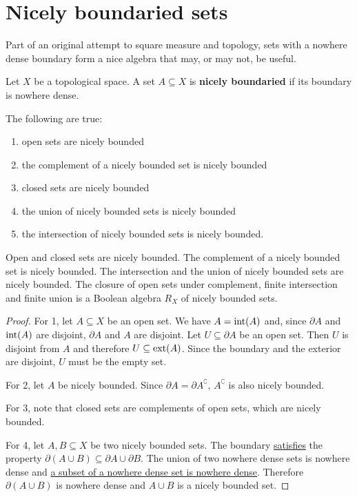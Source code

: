 \section{Nicely boundaried sets}
Part of an original attempt to square measure and topology, sets with a nowhere dense boundary form a nice algebra that may, or may not, be useful.

\begin{mathSection}
	\begin{defn}
		Let $X$ be a topological space. A set $A \subseteq X$ is \textbf{nicely boundaried} if its boundary is nowhere dense.
	\end{defn}
	
	\begin{prop}
		The following are true:
		\begin{enumerate}
			\item open sets are nicely bounded
			\item the complement of a nicely bounded set is nicely bounded
			\item closed sets are nicely bounded
			\item the union of nicely bounded sets is nicely bounded
			\item the intersection of nicely bounded sets is nicely bounded.
		\end{enumerate}
		
		Open and closed sets are nicely bounded. The complement of a nicely bounded set is nicely bounded. The intersection and the union of nicely bounded sets are nicely bounded. The closure of open sets under complement, finite intersection and finite union is a Boolean algebra $R_X$ of nicely bounded sets.
	\end{prop}
	
	\begin{proof}
		For 1, let $A \subseteq X$ be an open set. We have $A = \operatorname{int}(A)$ and, since $\partial A$ and $\operatorname{int}(A)$ are disjoint, $\partial A$ and $A$ are disjoint. Let $U \subseteq \partial A$ be an open set. Then $U$ is disjoint from $A$ and therefore $U \subseteq \operatorname{ext}(A)$. Since the boundary and the exterior are disjoint, $U$ must be the empty set.
		
		For 2, let $A$ be nicely bounded. Since $\partial A = \partial A^{\complement}$, $A^{\complement}$ is also nicely bounded.
		
		For 3, note that closed sets are complements of open sets, which are nicely bounded.
		
		For 4, let $A, B \subseteq X$ be two nicely bounded sets. The boundary \href{https://proofwiki.org/wiki/Boundary_of_Union_is_Subset_of_Union_of_Boundaries}{satisfies} the property $\partial (A \cup B) \subseteq \partial A \cup \partial B$. The union of two nowhere dense sets is nowhere dense and \href{https://proofwiki.org/wiki/Subset_of_Nowhere_Dense_Subset_is_Nowhere_Dense}{a subset of a nowhere dense set is nowhere dense}. Therefore $\partial (A \cup B)$ is nowhere dense and $A \cup B$ is a nicely bounded set.
		

\end{proof}
\end{mathSection}
